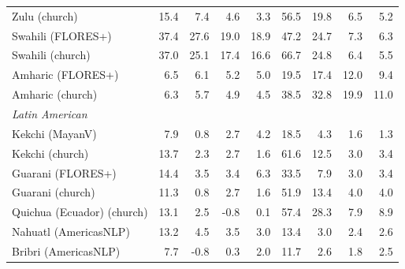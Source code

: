 \begin{table}[htbp]
\begin{tabular}{lrrrrrrrr}
Zulu (church) & 15.4 & \cellcolor{loss!13}7.4 & \cellcolor{loss!8}4.6 & \cellcolor{loss!6}3.3 & 56.5 & \cellcolor{loss!36}19.8 & \cellcolor{loss!12}6.5 & \cellcolor{loss!9}5.2 \\
Swahili (FLORES+) & 37.4 & \cellcolor{loss!50}27.6 & \cellcolor{loss!35}19.0 & \cellcolor{loss!34}18.9 & 47.2 & \cellcolor{loss!45}24.7 & \cellcolor{loss!13}7.3 & \cellcolor{loss!12}6.3 \\
Swahili (church) & 37.0 & \cellcolor{loss!46}25.1 & \cellcolor{loss!32}17.4 & \cellcolor{loss!30}16.6 & 66.7 & \cellcolor{loss!45}24.8 & \cellcolor{loss!12}6.4 & \cellcolor{loss!10}5.5 \\
Amharic (FLORES+) & 6.5 & \cellcolor{loss!11}6.1 & \cellcolor{loss!9}5.2 & \cellcolor{loss!9}5.0 & 19.5 & \cellcolor{loss!32}17.4 & \cellcolor{loss!22}12.0 & \cellcolor{loss!17}9.4 \\
Amharic (church) & 6.3 & \cellcolor{loss!10}5.7 & \cellcolor{loss!9}4.9 & \cellcolor{loss!8}4.5 & 38.5 & \cellcolor{loss!60}32.8 & \cellcolor{loss!36}19.9 & \cellcolor{loss!20}11.0 \\
\midrule \multicolumn{9}{l}{\textit{Latin American}} \\
Kekchi (MayanV) & 7.9 & \cellcolor{loss!2}0.8 & \cellcolor{loss!5}2.7 & \cellcolor{loss!8}4.2 & 18.5 & \cellcolor{loss!8}4.3 & \cellcolor{loss!3}1.6 & \cellcolor{loss!2}1.3 \\
Kekchi (church) & 13.7 & \cellcolor{loss!4}2.3 & \cellcolor{loss!5}2.7 & \cellcolor{loss!3}1.6 & 61.6 & \cellcolor{loss!23}12.5 & \cellcolor{loss!6}3.0 & \cellcolor{loss!6}3.4 \\
Guarani (FLORES+) & 14.4 & \cellcolor{loss!6}3.5 & \cellcolor{loss!6}3.4 & \cellcolor{loss!12}6.3 & 33.5 & \cellcolor{loss!14}7.9 & \cellcolor{loss!5}3.0 & \cellcolor{loss!6}3.4 \\
Guarani (church) & 11.3 & \cellcolor{loss!1}0.8 & \cellcolor{loss!5}2.7 & \cellcolor{loss!3}1.6 & 51.9 & \cellcolor{loss!25}13.4 & \cellcolor{loss!7}4.0 & \cellcolor{loss!7}4.0 \\
Quichua (Ecuador) (church) & 13.1 & \cellcolor{loss!5}2.5 & -0.8 & \cellcolor{loss!0}0.1 & 57.4 & \cellcolor{loss!52}28.3 & \cellcolor{loss!15}7.9 & \cellcolor{loss!16}8.9 \\
Nahuatl (AmericasNLP) & 13.2 & \cellcolor{loss!8}4.5 & \cellcolor{loss!6}3.5 & \cellcolor{loss!5}3.0 & 13.4 & \cellcolor{loss!5}3.0 & \cellcolor{loss!4}2.4 & \cellcolor{loss!5}2.6 \\
Bribri (AmericasNLP) & 7.7 & -0.8 & \cellcolor{loss!1}0.3 & \cellcolor{loss!4}2.0 & 11.7 & \cellcolor{loss!5}2.6 & \cellcolor{loss!3}1.8 & \cellcolor{loss!5}2.5 \\

\end{tabular}
\end{table}
